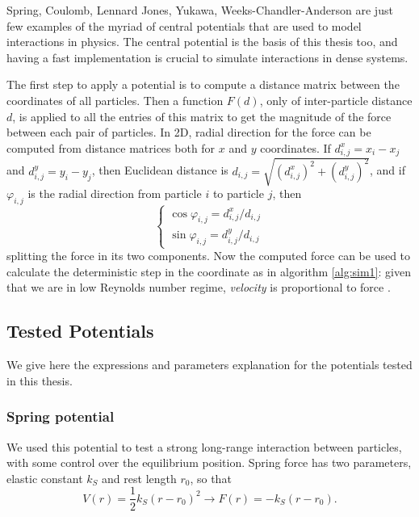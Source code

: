 \documentclass[../../master_thesis_np.tex]{subfiles}
\begin{document}
	Spring, Coulomb, Lennard Jones, Yukawa, Weeks-Chandler-Anderson are just few examples of the myriad of central potentials that are used to model interactions in physics. 
	The central potential is the basis of this thesis too, and having a fast implementation is crucial to simulate interactions in dense systems. 
	
	The first step {\color{brown}to apply a potential} is to compute a distance matrix between the coordinates of all particles. 
	Then a function $F(d)$, only of inter-particle distance $d$, is applied to all the entries of this matrix to get the magnitude of the force between each pair of particles. 
	In 2D, radial direction for the force can be computed from distance matrices both for $x$ and $y$ coordinates. 
	If $d^x_{i,j} = x_i - x_j$ and $d^y_{i,j} = y_i - y_j$, then Euclidean distance is $d_{i,j} = \sqrt{(d^x_{i,j})^2 + (d^y_{i,j})^2}$, and if $\varphi_{i,j}$ is the radial direction from particle $i$ to particle $j$, then
	\begin{equation}
		\begin{cases}
			\cos\varphi_{i,j} = d^x_{i,j}/d_{i,j}\\
			\sin\varphi_{i,j} = d^y_{i,j}/d_{i,j}
		\end{cases}
	\end{equation}
	splitting the force in its two components.
	Now the computed force can be used to calculate the deterministic step in the coordinate as in algorithm \ref{alg:sim1}: given that we are in low Reynolds number regime, \emph{velocity} is proportional to force . 
	
	\subsection{Tested Potentials}
			
	We give here the expressions and parameters explanation for the potentials tested in this thesis.
	
	\subsubsection{Spring potential}
	We used this potential to test a strong long-range interaction between particles, with some control over the equilibrium position.
	Spring force has two parameters, elastic constant $k_S$ and rest length $r_0$, so that 
	\begin{equation}
		V(r) = \frac{1}{2}k_S (r-r_0)^2 \rightarrow F(r) = -k_S(r-r_0).
	\end{equation}
\end{document}
